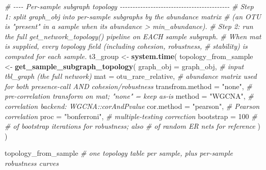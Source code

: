 \documentclass[
]{book}
\newenvironment{Shaded}{\begin{snugshade}}{\end{snugshade}}
\newcommand{\AttributeTok}[1]{\textcolor[rgb]{0.13,0.29,0.53}{#1}}
\newcommand{\CommentTok}[1]{\textcolor[rgb]{0.56,0.35,0.01}{\textit{#1}}}
\newcommand{\DecValTok}[1]{\textcolor[rgb]{0.00,0.00,0.81}{#1}}
\newcommand{\FunctionTok}[1]{\textcolor[rgb]{0.13,0.29,0.53}{\textbf{#1}}}
\newcommand{\NormalTok}[1]{#1}
\newcommand{\OtherTok}[1]{\textcolor[rgb]{0.56,0.35,0.01}{#1}}
\newcommand{\StringTok}[1]{\textcolor[rgb]{0.31,0.60,0.02}{#1}}
\begin{document}
\begin{Shaded}
\begin{Highlighting}[]
\CommentTok{\# {-}{-}{-}{-} Per{-}sample subgraph topology {-}{-}{-}{-}{-}{-}{-}{-}{-}{-}{-}{-}{-}{-}{-}{-}{-}{-}{-}{-}{-}{-}{-}{-}{-}{-}{-}{-}{-}{-}{-}{-}{-}{-}{-}{-}{-}{-}{-}{-}{-}{-}{-}}
\CommentTok{\# Step 1: split \textasciigrave{}graph\_obj\textasciigrave{} into per{-}sample subgraphs by the abundance matrix}
\CommentTok{\#         (an OTU is "present" in a sample when its abundance \textgreater{} min\_abundance).}
\CommentTok{\# Step 2: run the full \textasciigrave{}get\_network\_topology()\textasciigrave{} pipeline on EACH sample subgraph.}
\CommentTok{\# When \textasciigrave{}mat\textasciigrave{} is supplied, every topology field (including cohesion, robustness,}
\CommentTok{\# stability) is computed for each sample.}
\NormalTok{t3\_group }\OtherTok{\textless{}{-}} \FunctionTok{system.time}\NormalTok{(}
\NormalTok{  topology\_from\_sample }\OtherTok{\textless{}{-}} \FunctionTok{get\_sample\_subgraph\_topology}\NormalTok{(}
    \AttributeTok{graph\_obj        =}\NormalTok{ graph\_obj,         }\CommentTok{\# input tbl\_graph (the full network)}
    \AttributeTok{mat              =}\NormalTok{ otu\_rare\_relative, }\CommentTok{\# abundance matrix used for both presence{-}call AND cohesion/robustness}
    \AttributeTok{transfrom.method =} \StringTok{"none"}\NormalTok{,            }\CommentTok{\# pre{-}correlation transform on \textasciigrave{}mat\textasciigrave{}; "none" = keep as{-}is}
    \AttributeTok{method           =} \StringTok{"WGCNA"}\NormalTok{,           }\CommentTok{\# correlation backend: WGCNA::corAndPvalue}
    \AttributeTok{cor.method       =} \StringTok{"pearson"}\NormalTok{,         }\CommentTok{\# Pearson correlation}
    \AttributeTok{proc             =} \StringTok{"bonferroni"}\NormalTok{,      }\CommentTok{\# multiple{-}testing correction }
    \AttributeTok{bootstrap        =} \DecValTok{100}                \CommentTok{\# \# of bootstrap iterations for robustness; also \# of random ER nets for reference}
\NormalTok{  )}
\NormalTok{)}

\NormalTok{topology\_from\_sample   }\CommentTok{\# one topology table per sample, plus per{-}sample robustness curves}
\end{Highlighting}
\end{Shaded}
\end{document}
